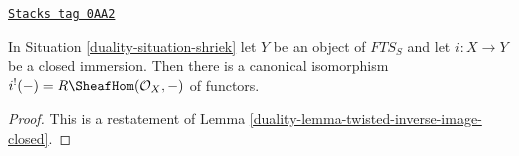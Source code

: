 \begin{lemma}
\label{duality-lemma-shriek-closed-immersion}
\href{https://stacks.math.columbia.edu/tag/0AA2}{\texttt{Stacks tag 0AA2}}

In Situation \ref{duality-situation-shriek} let $Y$ be an object of
$\textit{FTS}_S$ and let $i : X \to Y$ be a closed immersion.
Then there is a canonical isomorphism
$i^!(-) = R\SheafHom(\mathcal{O}_X, -)$ of functors.
\end{lemma}

\begin{proof}

This is a restatement of Lemma \ref{duality-lemma-twisted-inverse-image-closed}.
\end{proof}

